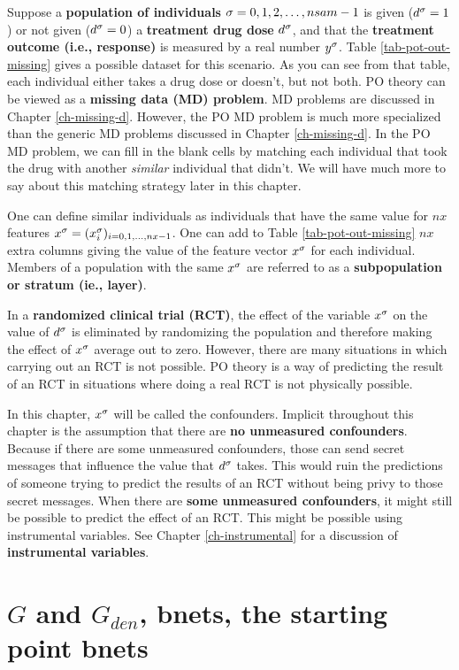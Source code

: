 Suppose a {\bf population
of individuals} $\sigma=0,1,2, \ldots, nsam-1$
is given ($d^\sigma=1$) or
not given ($d^\sigma=0$)
a {\bf treatment drug dose} $d^\sigma$,
and that
the 
 {\bf treatment outcome (i.e., response)}
is measured by
a real number $y^\sigma$.
Table \ref{tab-pot-out-missing}
gives a possible dataset
for this scenario.
As you
can see from
that table,
each individual 
either takes a drug
dose or
doesn't,
but not both.
PO theory
can be viewed as a
 {\bf  missing
data (MD) problem}. MD problems are 
discussed in
 Chapter \ref{ch-missing-d}.
However, the PO MD problem 
is much more specialized
than the generic MD problems
discussed in Chapter \ref{ch-missing-d}.
In the PO MD
problem, we can
fill
in the blank cells
by matching
each individual
that took
the drug with
another {\it similar} 
individual that didn't.
We will have much
more to say about
this matching
strategy later in this chapter.

One can define
similar
individuals as 
individuals that have the same
value
for $nx$ features $x^\sigma=(x^\sigma_i)_{i=0, 1, \ldots, nx-1}$.
One
can add to Table \ref{tab-pot-out-missing}
 $nx$ extra columns
giving the value of
the feature vector $x^\sigma$
for each individual.
Members
of a population with
the same $x^\sigma$ 
are referred to as 
a
{\bf subpopulation or stratum (ie., layer)}.

In a {\bf randomized clinical trial (RCT)},
the effect 
of the variable $x^\sigma$ on 
the value
of $d^\sigma$
is eliminated by
randomizing
the population
and therefore
making the effect of $x^\sigma$
average out  to zero.
However,
there are many situations
in which carrying out an RCT is not
possible. PO theory is
a way of predicting the
result
of an RCT in situations where
doing a real RCT is not physically possible.

In this chapter, $x^\sigma$
will be called the confounders.
Implicit throughout this chapter
is the assumption that there are {\bf 
no unmeasured confounders}.
Because if 
there are some unmeasured confounders,
those can
send secret messages 
that influence the value 
that $d^\sigma$ takes.
This would ruin
the
predictions
of someone trying
to predict the results of an RCT
without
being privy to those secret 
messages.
When there are {\bf some
unmeasured confounders},
it might still be
possible
to
predict the effect of an RCT.
This might be possible
using instrumental variables. See Chapter
\ref{ch-instrumental}
for a discussion
of {\bf instrumental
variables}.


\section{$G$ and $G_{den}$,
bnets,
the starting point bnets}


